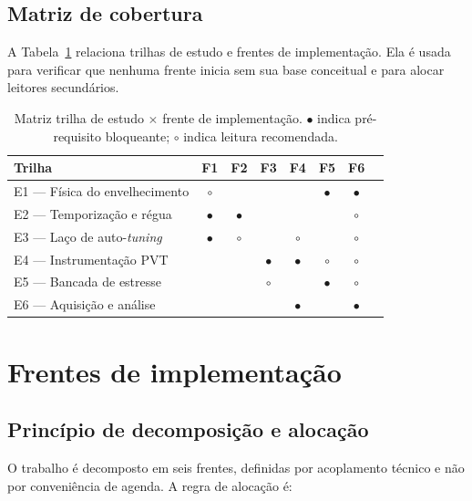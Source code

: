 \documentclass[11pt,a4paper]{article}
\begin{document}
\subsection{Matriz de cobertura}

A Tabela~\ref{tab:cobertura} relaciona trilhas de estudo e frentes de implementação.
Ela é usada para verificar que nenhuma frente inicia sem sua base conceitual e para
alocar leitores secundários.

\begin{table}[htbp]
\centering
\caption{Matriz trilha de estudo $\times$ frente de implementação.
$\bullet$ indica pré-requisito bloqueante; $\circ$ indica leitura recomendada.}
\label{tab:cobertura}
\small
\begin{tabular}{@{}lccccccl@{}}
\toprule
\textbf{Trilha} & \textbf{F1} & \textbf{F2} & \textbf{F3} & \textbf{F4} & \textbf{F5} & \textbf{F6} \\
\midrule
E1 --- Física do envelhecimento & $\circ$ & & & & $\bullet$ & $\bullet$ \\
E2 --- Temporização e régua & $\bullet$ & $\bullet$ & & & & $\circ$ \\
E3 --- Laço de auto-\emph{tuning} & $\bullet$ & $\circ$ & & $\circ$ & & $\circ$ \\
E4 --- Instrumentação PVT & & & $\bullet$ & $\bullet$ & $\circ$ & $\circ$ \\
E5 --- Bancada de estresse & & & $\circ$ & & $\bullet$ & $\circ$ \\
E6 --- Aquisição e análise & & & & $\bullet$ & & $\bullet$ \\
\bottomrule
\end{tabular}
\end{table}

\clearpage
\section{Frentes de implementação}

\subsection{Princípio de decomposição e alocação}

O trabalho é decomposto em seis frentes, definidas por acoplamento técnico e não por
conveniência de agenda. A regra de alocação é:
\end{document}
